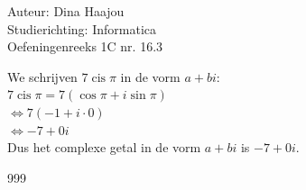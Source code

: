\documentclass[a4paper]{article}
\begin{document}
\noindent \large Auteur: Dina Haajou \\
\noindent \large Studierichting: Informatica \\
\noindent \large Oefeningenreeks 1C nr. 16.3 \\

\normalsize

We schrijven $7\operatorname{cis} \pi$ in de vorm $a + bi$: \\

$7\operatorname{cis} \pi = 7(\cos \pi + i\sin \pi)$ \\

$\Leftrightarrow 7(-1 + i \cdot 0)$ \\

$\Leftrightarrow -7 + 0i$ \\

Dus het complexe getal in de vorm $a + bi$ is $-7 + 0i$. \\

\begin{thebibliography}{999}
\end{thebibliography}
\end{document}
